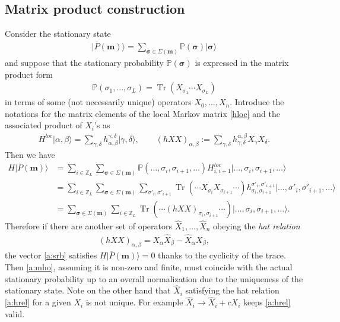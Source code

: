 \documentclass[11pt]{article}
\theoremstyle{definition}
\numberwithin{equation}{section}
\newcommand{\Z}{{\mathbb Z}}
\newcommand{\ket}[1]{\lvert #1 \rangle}
\newcommand{\stprob}{\mathbb{P}}
\newcommand{\mm}{\mathbf{m}}
\DeclareMathOperator{\tr}{Tr}
\newcommand{\defn}[1]{{\color{blue}\emph{#1}}}
\begin{document}
\subsection{Matrix product construction}\label{a:subsec:mp}

Consider the stationary state
\begin{align}\label{a:srb}
\ket{\overline{P}(\mm)} = \sum_{{\boldsymbol \sigma} \in \Sigma(\mm)}
\stprob({\boldsymbol \sigma}) \ket{ {\boldsymbol \sigma} }
\end{align}
and suppose that the stationary probability $\stprob({\boldsymbol \sigma})$ 
is expressed in the matrix product form
\begin{align}\label{a:mho}
\stprob(\sigma_1,\ldots, \sigma_L) 
= \tr (X_{\sigma_1}\cdots X_{\sigma_L})
\end{align}
in terms of some (not necessarily unique) operators $X_0, \ldots, X_n$.
Introduce the notations for the matrix elements of the local Markov matrix \eqref{hloc} and 
the associated product of $X_i$'s as
\begin{align}\label{a:hdef}
H^{loc}\ket{\alpha, \beta } = \sum_{\gamma,\delta}h^{\gamma,\delta}_{\alpha,\beta}
\ket{\gamma, \delta},\qquad
(hXX)_{\alpha, \beta} := \sum_{\gamma,\delta}h^{\alpha,\beta}_{\gamma,\delta}
X_\gamma X_\delta.
\end{align}
Then we have
\begin{align*}
H  \ket{\overline{P}(\mm)} 
&= \sum_{i \in \Z_L}
\sum_{\boldsymbol \sigma \in \Sigma(\mm)} \stprob(\ldots, \sigma_i, \sigma_{i+1},\ldots) H^{loc}_{i,i+1}
\ket{\ldots, \sigma_i, \sigma_{i+1},\ldots}\\
&= \sum_{i \in \Z_L} \sum_{\boldsymbol \sigma \in \Sigma(\mm)} \sum_{\sigma'_i, \sigma'_{i+1}}
\tr(\cdots X_{\sigma_i}X_{\sigma_{i+1}}\cdots )
h^{\sigma'_i, \sigma'_{i+1}}_{\sigma_i, \sigma_{i+1}}
\ket{\ldots, \sigma'_i, \sigma'_{i+1},\ldots}\\
&= \sum_{\boldsymbol \sigma \in \Sigma(\mm)}\sum_{i \in \Z_L}
\tr(\cdots (hXX)_{\sigma_i, \sigma_{i+1}}\cdots )
\ket{\ldots, \sigma_i, \sigma_{i+1},\ldots}.
\end{align*}
Therefore if there are another set of operators 
${\widehat X}_1, \ldots, {\widehat X}_n$ obeying the \defn{hat relation}
\begin{align}\label{a:hrel}
(hXX)_{\alpha, \beta} = X_\alpha {\widehat X}_\beta - {\widehat X}_\alpha X_\beta,
\end{align}
the vector \eqref{a:srb}  satisfies $H\ket{\overline{P}(\mm)} = 0$ 
thanks to the cyclicity of the trace.
Then \eqref{a:mho}, assuming it is non-zero and finite, must coincide with the actual stationary probability 
up to an overall normalization due to the uniqueness of the stationary state.
Note on the other hand that ${\widehat X}_i$ satisfying the hat relation \eqref{a:hrel}
for a given $X_i$ is not unique.
For example
${\widehat X}_i \rightarrow {\widehat X}_i+ c X_i$ keeps \eqref{a:hrel} valid.
\end{document}
